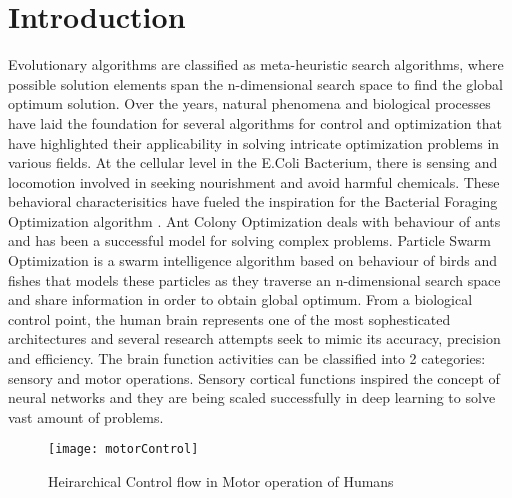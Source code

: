 \section{Introduction}

Evolutionary algorithms are classified as meta-heuristic search algorithms, where possible solution elements span the n-dimensional search space to find the global optimum solution. Over the years, natural phenomena and biological processes have laid the foundation for several algorithms for control and optimization that have highlighted their applicability in solving intricate optimization problems in various fields. At the cellular level in the E.Coli Bacterium, there is sensing and locomotion involved in seeking nourishment and avoid harmful chemicals. These behavioral characterisitics have fueled the inspiration for the Bacterial Foraging Optimization algorithm \cite{passino2002biomimicry}\cite{onwubolu2013new}. Ant Colony Optimization \cite{dorigo2010ant} deals with behaviour of ants and has been a successful model for solving complex problems. Particle Swarm Optimization \cite{kennedy2011particle} is a swarm intelligence algorithm based on behaviour of birds and fishes that models these particles as they traverse an n-dimensional search space and share information in order to obtain global optimum.
From a biological control point, the human brain represents one of the most sophesticated architectures and several research attempts seek to mimic its accuracy, precision and efficiency. The brain function activities can be classified into 2 categories: sensory and motor operations. Sensory cortical functions inspired the concept of neural networks and they are being scaled successfully in deep learning to solve vast amount of problems.

\begin{figure}[h!]
  \texttt{[image: motorControl]}
  \caption{Heirarchical Control flow in Motor operation of Humans}
  \label{fig:motorControl}
\end{figure}

